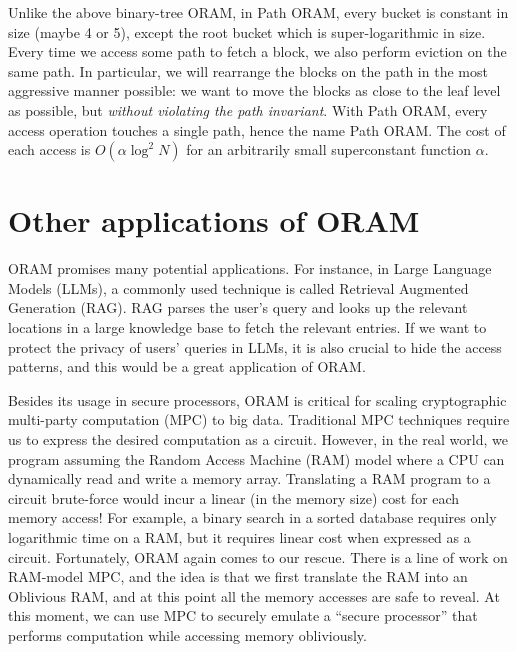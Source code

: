 Unlike the above binary-tree ORAM, in Path ORAM, every bucket is
constant in size (maybe 4 or 5), except the root bucket which is
super-logarithmic in size. Every time we access some path to fetch a
block, we also perform eviction on the same path. In particular, we will
rearrange the blocks on the path in the most aggressive manner possible:
we want to move the blocks as close to the leaf level as possible, but
\emph{without violating the path invariant}. With Path ORAM, every
access operation touches a single path, hence the name Path ORAM. The
cost of each access is $O( \alpha\log^{2}N )$ for an
arbitrarily small superconstant function $\alpha$.

\section{Other applications of
ORAM}\label{other-applications-of-oram}

ORAM promises many potential applications. For instance, in Large
Language Models (LLMs), a commonly used technique is called Retrieval
Augmented Generation (RAG). RAG parses the user's query and looks up the
relevant locations in a large knowledge base to fetch the relevant
entries. If we want to protect the privacy of users' queries in LLMs, it
is also crucial to hide the access patterns, and this would be a great
application of ORAM.

Besides its usage in secure processors, ORAM is critical for scaling
cryptographic multi-party computation (MPC) to big data. Traditional MPC
techniques require us to express the desired computation as a circuit.
However, in the real world, we program assuming the Random Access
Machine (RAM) model where a CPU can dynamically read and write a memory
array. Translating a RAM program to a circuit brute-force would incur a
linear (in the memory size) cost for each memory access! For example, a
binary search in a sorted database requires only logarithmic time on a
RAM, but it requires linear cost when expressed as a circuit.
Fortunately, ORAM again comes to our rescue. There is a line of work on
RAM-model MPC, and the idea is that we first translate the RAM into an
Oblivious RAM, and at this point all the memory accesses are safe to
reveal. At this moment, we can use MPC to securely emulate a ``secure
processor'' that performs computation while accessing memory
obliviously.

